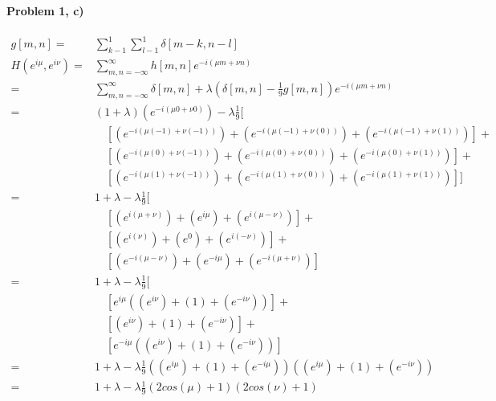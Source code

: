 \documentclass[11pt]{article}
\begin{document}
\paragraph{\noindent\textbf{\LARGE{Problem 1, c)}}}  
\begin{equation*}
\begin{split}
    g[m,n]  = & \sum_{k-1}^1 \sum_{l-1}^1 \delta[m-k, n-l]  \\
    H(e^{i\mu}, e^{i\nu}) = &\sum_{m,n = -\infty }^\infty h[m,n] e^{-i(\mu m + \nu n)} \\
                        = & \sum_{m,n = -\infty }^\infty \delta[m,n] + \lambda (\delta[m,n] - \frac{1}{9}g[m,n]) e^{-i(\mu m + \nu n)} \\
                        = & (1 + \lambda)(e^{-i(\mu 0 + \nu 0)} )  - \lambda \frac{1}{9} [\\
                        & \quad [(e^{-i(\mu (-1) + \nu (-1))}) + (e^{-i(\mu (-1) + \nu (0))}) + ( e^{-i(\mu (-1) + \nu (1))})] +\\
                        & \quad [(e^{-i(\mu (0) + \nu (-1))}) + (e^{-i(\mu (0) + \nu (0))}) + ( e^{-i(\mu (0) + \nu (1))})] +\\
                        & \quad [(e^{-i(\mu (1) + \nu (-1))}) + (e^{-i(\mu (1) + \nu (0))}) + ( e^{-i(\mu (1) + \nu (1))})] ]\\
                        = & 1 + \lambda - \lambda \frac{1}{9} [ \\
                        & \quad [(e^{i(\mu + \nu)})+(e^{i\mu})+(e^{i(\mu - \nu)})] + \\
                        & \quad [(e^{i(\nu)})+(e^{0})+(e^{i(-\nu)})] + \\
                        & \quad [(e^{-i(\mu - \nu)})+(e^{-i\mu})+(e^{-i(\mu + \nu)})]  \\
                        = & 1 + \lambda - \lambda \frac{1}{9} [ \\
                        & \quad [e^{i\mu}((e^{i\nu})+ (1) + (e^{- i\nu}))] + \\
                        & \quad [(e^{i\nu})+ (1) + (e^{- i\nu})] + \\
                        & \quad  [e^{-i\mu}((e^{i\nu})+ (1) + (e^{- i\nu}))]  \\
                        = & 1 + \lambda - \lambda \frac{1}{9} ((e^{i\mu})+ (1) + (e^{- i\mu}))((e^{i\mu})+ (1) + (e^{- i\nu})) \\
                        = & 1 + \lambda - \lambda \frac{1}{9} ( 2cos(\mu) + 1)(2 cos(\nu) + 1)
\end{split}
\end{equation*}
\end{document}
